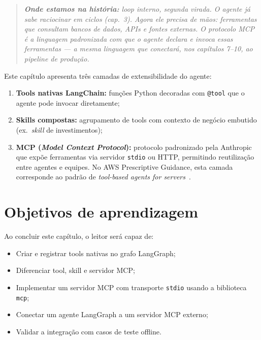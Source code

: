\begin{quote}\itshape
\textbf{Onde estamos na hist\'oria:} loop interno, segunda virada.
O agente j\'a sabe raciocinar em ciclos (cap.~3). Agora ele precisa
de m\~aos: ferramentas que consultam bancos de dados, APIs e fontes
externas. O protocolo MCP \'e a linguagem padronizada com que o
agente declara e invoca essas ferramentas --- a mesma linguagem que
conectar\'a, nos cap\'itulos 7--10, ao pipeline de produ\c{c}\~ao.
\end{quote}

Este cap\'itulo apresenta tr\^es camadas de extensibilidade do agente:

\begin{enumerate}[leftmargin=*]
  \item \textbf{Tools nativas LangChain:} fun\c{c}\~oes Python decoradas
        com \texttt{@tool} que o agente pode invocar diretamente;
  \item \textbf{Skills compostas:} agrupamento de tools com contexto
        de neg\'ocio embutido (ex.\ \textit{skill} de investimentos);
  \item \textbf{MCP (\textit{Model Context Protocol}):} protocolo
        padronizado pela Anthropic que expõe ferramentas via servidor
        \texttt{stdio} ou HTTP, permitindo reutiliza\c{c}\~ao entre
        agentes e equipes. No AWS Prescriptive Guidance, esta camada
        corresponde ao padr\~ao de \textit{tool-based agents for servers}~\cite{awsagentic2025}.
\end{enumerate}

\section{Objetivos de aprendizagem}

Ao concluir este cap\'itulo, o leitor ser\'a capaz de:

\begin{itemize}[leftmargin=*]
  \item Criar e registrar tools nativas no grafo LangGraph;
  \item Diferenciar tool, skill e servidor MCP;
  \item Implementar um servidor MCP com transporte \texttt{stdio}
        usando a biblioteca \texttt{mcp};
  \item Conectar um agente LangGraph a um servidor MCP externo;
  \item Validar a integra\c{c}\~ao com casos de teste offline.
\end{itemize}

